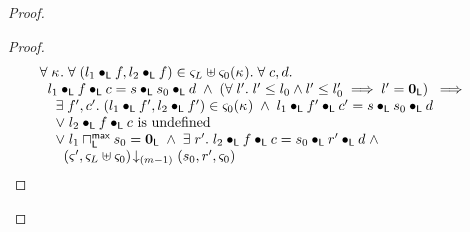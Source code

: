 \begin{lemma}[]
\begin{proof}
\begin{proof}
\begin{align}
	&\begin{array}{l}
		\for{\ca{}} \for{(l_1 \composeL f, l_2 \composeL f) \in \amod{L} \uplus \amod{0}(\ca{})} \for{c, d} \\
  \hspace*{0.2cm} l_1 \composeL f \composeL c = s \composeL s_0 \composeL d \;\land\; \left(\for{l'} l' \leq l_0 \land l' \leq l'_0 \implies l' = \unitL\right)  \;\implies\\
  \hspace*{0.4cm}\exsts{f', c'} (l_1 \composeL f', l_2 \composeL f') \in \amod{0}(\ca{}) \;\land\; l_1 \composeL f' \composeL c' =  s \composeL s_0 \composeL d\\
		\hspace*{0.4cm}\lor\;l_2 \composeL f \composeL c \text{ is undefined}\\
		\hspace*{0.4cm}\lor\; l_1 \maxMeetL s_0 = \unitL \;\land\; \exsts{r'} l_2 \composeL f \composeL c = s_0 \composeL r' \composeL d \;\land\\
		\hspace*{0.6cm} \extendsAMUpto{\amod{}', \amod{L} \uplus \amod{0}}{(m-1)}{s_0}{r'}{\amod{0}}
%		
	\end{array} \label{LAW:Goal9}
\end{align}
%


\end{proof}
\end{proof}
\end{lemma}
